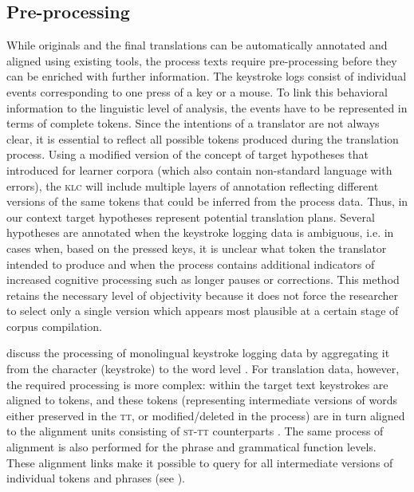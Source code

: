 \documentclass[output=paper]{LSP/langsci}
\begin{document}
\subsection{Pre-processing} \label{sec:1:2:2}
While originals and the final translations can be automatically annotated and aligned using existing tools, the process texts require pre-processing before they can be enriched with further information. The keystroke logs consist of individual events corresponding to one press of a key or a mouse. To link this behavioral information to the linguistic level of analysis, the events have to be represented in terms of complete tokens. Since the intentions of a translator are not always clear, it is essential to reflect all possible tokens produced during the translation process. Using a modified version of the concept of target hypotheses that \citet{Lüdeling2008} introduced for learner corpora (which also contain non-standard language with errors), the \textsc{klc} will include multiple layers of annotation reflecting different versions of the same tokens that could be inferred from the process data. Thus, in our context target hypotheses represent potential translation plans. Several hypotheses are annotated when the keystroke logging data is ambiguous, i.e. in cases when, based on the pressed keys, it is unclear what token the translator intended to produce and when the process contains additional indicators of increased cognitive processing such as longer pauses or corrections. This method retains the necessary level of objectivity because it does not force the researcher to select only a single version which appears most plausible at a certain stage of corpus compilation.

\citet{Leijten2012} discuss the processing of monolingual keystroke logging data by aggregating it from the character (keystroke) to the word level \citep[see also][]{Macken2012}. For translation data, however, the required processing is more complex: within the target text keystrokes are aligned to tokens, and these tokens (representing intermediate versions of words either preserved in the \textsc{tt}, or modified/deleted in the process) are in turn aligned to the alignment units consisting of \textsc{st}-\textsc{tt} counterparts \citep[see][227]{Carl2009a}. The same process of alignment is also performed for the phrase and grammatical function levels. These alignment links make it possible to query for all intermediate versions of individual tokens and phrases (see ).
\end{document}

